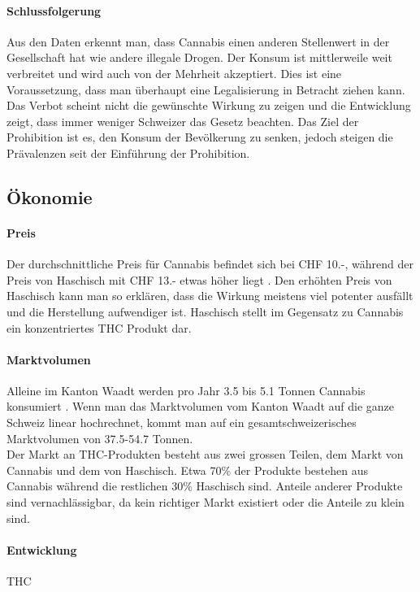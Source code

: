 \documentclass[../main.tex]{subfiles}
\begin{document}
	\paragraph{Schlussfolgerung}
	Aus den Daten erkennt man, dass Cannabis einen anderen Stellenwert in der Gesellschaft hat wie andere illegale Drogen.
	Der Konsum ist mittlerweile weit verbreitet und wird auch von der Mehrheit akzeptiert.
	Dies ist eine Voraussetzung, dass man überhaupt eine Legalisierung in Betracht ziehen kann.\\
	
	\noindent
	Das Verbot scheint nicht die gewünschte Wirkung zu zeigen und die Entwicklung zeigt, dass immer weniger Schweizer das Gesetz beachten.
	Das Ziel der Prohibition ist es, den Konsum der Bevölkerung zu senken, jedoch steigen die Prävalenzen seit der Einführung der Prohibition.
	
	\subsection{Ökonomie}
	
	\paragraph{Preis}
	Der durchschnittliche Preis für Cannabis befindet sich bei CHF 10.-, während der Preis von Haschisch mit CHF 13.- etwas höher liegt \cite{zobel}.
	Den erhöhten Preis von Haschisch kann man so erklären, dass die Wirkung meistens viel potenter ausfällt und die Herstellung aufwendiger ist.
	Haschisch stellt im Gegensatz zu Cannabis ein konzentriertes THC Produkt dar.
	
	
	\paragraph{Marktvolumen}
	Alleine im Kanton Waadt werden pro Jahr 3.5 bis 5.1 Tonnen Cannabis konsumiert \cite{zobel}. 	
	Wenn man das Marktvolumen vom Kanton Waadt auf die ganze Schweiz linear hochrechnet, kommt man auf ein gesamtschweizerisches Marktvolumen von 37.5-54.7 Tonnen.\\
	
	\noindent
	Der Markt an THC-Produkten besteht aus zwei grossen Teilen, dem Markt von Cannabis und dem von Haschisch.
	Etwa 70\% der Produkte bestehen aus Cannabis während die restlichen 30\% Haschisch sind.
	Anteile anderer Produkte sind vernachlässigbar, da kein richtiger Markt existiert oder die Anteile zu klein sind.
	
	

	\paragraph{Entwicklung}
	THC
	
	
	
	
	

	
	
	
\end{document}
